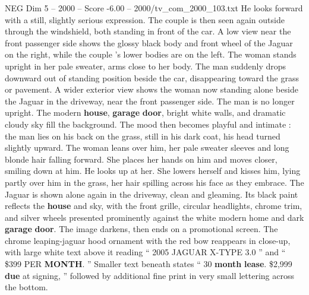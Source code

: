 \begin{textsample}{NEG Dim 5 – 2000 – Score -6.00 – 2000/tv\_com\_2000\_103.txt}
He looks forward with a still, slightly serious expression.
The couple is then seen again outside through the windshield, both standing in front of the car.
A low view near the front passenger side shows the glossy black body and front wheel of the Jaguar on the right, while the couple ’s lower bodies are on the left.
The woman stands upright in her pale sweater, arms close to her body.
The man suddenly drops downward out of standing position beside the car, disappearing toward the grass or pavement.
A wider exterior view shows the woman now standing alone beside the Jaguar in the driveway, near the front passenger side.
The man is no longer upright.
The modern \textbf{house}, \textbf{garage} \textbf{door}, bright white walls, and dramatic cloudy sky fill the background.
The mood then becomes playful and intimate : the man lies on his back on the grass, still in his dark coat, his head turned slightly upward.
The woman leans over him, her pale sweater sleeves and long blonde hair falling forward.
She places her hands on him and moves closer, smiling down at him.
He looks up at her.
She lowers herself and kisses him, lying partly over him in the grass, her hair spilling across his face as they embrace.
The Jaguar is shown alone again in the driveway, clean and gleaming.
Its black paint reflects the \textbf{house} and sky, with the front grille, circular headlights, chrome trim, and silver wheels presented prominently against the white modern home and dark \textbf{garage} \textbf{door}.
The image darkens, then ends on a promotional screen.
The chrome leaping-jaguar hood ornament with the red bow reappears in close-up, with large white text above it reading “ 2005 JAGUAR X-TYPE 3.0 ” and “ \$399 PER \textbf{MONTH}. ” Smaller text beneath states “ 30 \textbf{month} \textbf{lease}. \$2,999 \textbf{due} at signing, ” followed by additional fine print in very small lettering across the bottom.

\end{textsample}
